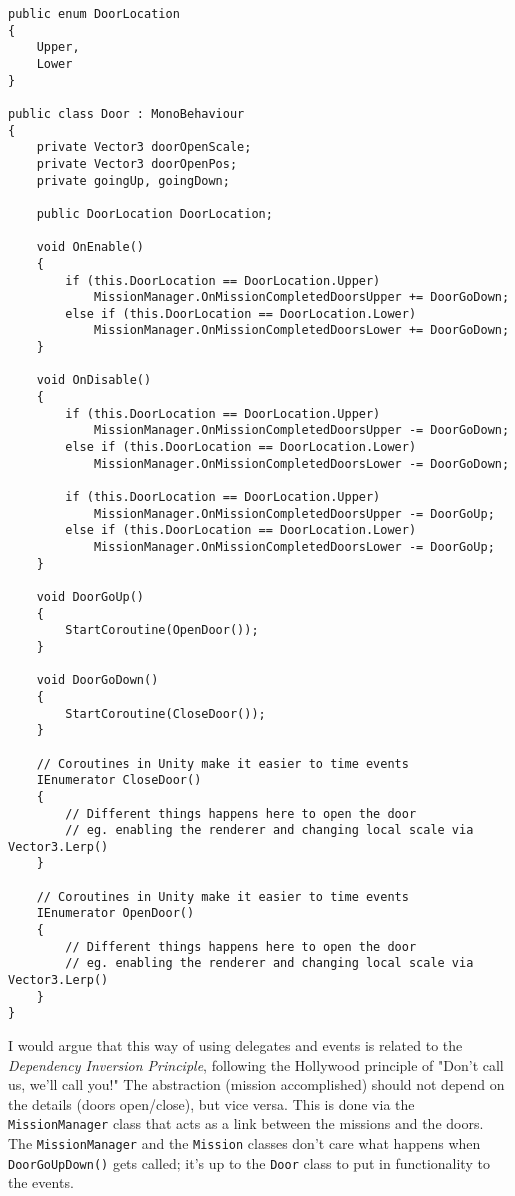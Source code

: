 \begin{lstlisting}
public enum DoorLocation
{
    Upper,
    Lower
}

public class Door : MonoBehaviour
{
    private Vector3 doorOpenScale;
    private Vector3 doorOpenPos;
    private goingUp, goingDown;

    public DoorLocation DoorLocation;

    void OnEnable()
    {
        if (this.DoorLocation == DoorLocation.Upper)
            MissionManager.OnMissionCompletedDoorsUpper += DoorGoDown;
        else if (this.DoorLocation == DoorLocation.Lower)
            MissionManager.OnMissionCompletedDoorsLower += DoorGoDown;
    }

    void OnDisable()
    {
        if (this.DoorLocation == DoorLocation.Upper)
            MissionManager.OnMissionCompletedDoorsUpper -= DoorGoDown;
        else if (this.DoorLocation == DoorLocation.Lower)
            MissionManager.OnMissionCompletedDoorsLower -= DoorGoDown;

        if (this.DoorLocation == DoorLocation.Upper)
            MissionManager.OnMissionCompletedDoorsUpper -= DoorGoUp;
        else if (this.DoorLocation == DoorLocation.Lower)
            MissionManager.OnMissionCompletedDoorsLower -= DoorGoUp;
    }

    void DoorGoUp()
    {
        StartCoroutine(OpenDoor());
    }

    void DoorGoDown()
    {
        StartCoroutine(CloseDoor());
    }

    // Coroutines in Unity make it easier to time events
    IEnumerator CloseDoor()
    {
        // Different things happens here to open the door
        // eg. enabling the renderer and changing local scale via Vector3.Lerp()
    }

    // Coroutines in Unity make it easier to time events
    IEnumerator OpenDoor()
    {
        // Different things happens here to open the door
        // eg. enabling the renderer and changing local scale via Vector3.Lerp()
    }
}
\end{lstlisting}

I would argue that this way of using delegates and events is related to the \textit{Dependency Inversion Principle}, following the Hollywood principle of "Don't call us, we'll call you!" The abstraction (mission accomplished) should not depend on the details (doors open/close), but vice versa. This is done via the \texttt{MissionManager} class that acts as a link between the missions and the doors. The \texttt{MissionManager} and the \texttt{Mission} classes don't care what happens when \texttt{DoorGoUpDown()} gets called; it's up to the \texttt{Door} class to put in functionality to the events.